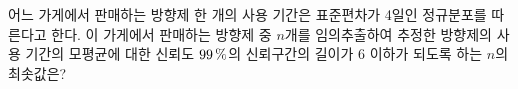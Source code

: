 어느 가게에서 판매하는 방향제 한 개의 사용 기간은 표준편차가 4일인 정규분포를 따른다고 한다. 이 가게에서 판매하는 방향제 중 $n$개를 임의추출하여 추정한 방향제의 사용 기간의 모평균에 대한 신뢰도 $99\mkern3mu \%$의 신뢰구간의 길이가 6 이하가 되도록 하는 $n$의 최솟값은? 
